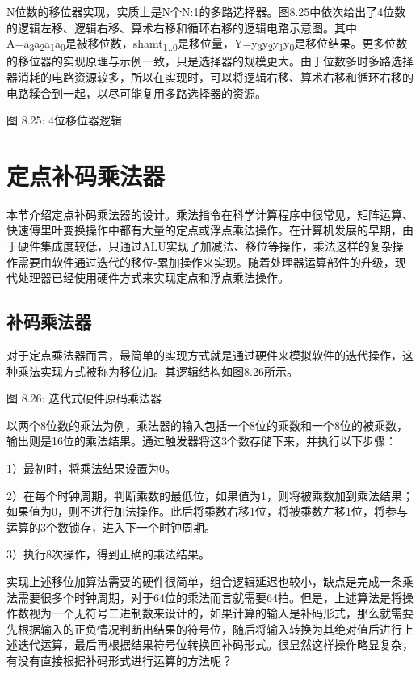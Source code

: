\documentclass[]{ctexbook}
\begin{document}
N位数的移位器实现，实质上是N个N:1的多路选择器。图8.25中依次给出了4位数的逻辑左移、逻辑右移、算术右移和循环右移的逻辑电路示意图。其中A=a\textsubscript{3}a\textsubscript{2}a\textsubscript{1}a\textsubscript{0}是被移位数，shamt\textsubscript{1..0}是移位量，Y=y\textsubscript{3}y\textsubscript{2}y\textsubscript{1}y\textsubscript{0}是移位结果。更多位数的移位器的实现原理与示例一致，只是选择器的规模更大。由于位数多时多路选择器消耗的电路资源较多，所以在实现时，可以将逻辑右移、算术右移和循环右移的电路糅合到一起，以尽可能复用多路选择器的资源。

图 8.25: 4位移位器逻辑

\hypertarget{ux5b9aux70b9ux8865ux7801ux4e58ux6cd5ux5668}{%
\section{定点补码乘法器}\label{ux5b9aux70b9ux8865ux7801ux4e58ux6cd5ux5668}}

本节介绍定点补码乘法器的设计。乘法指令在科学计算程序中很常见，矩阵运算、快速傅里叶变换操作中都有大量的定点或浮点乘法操作。在计算机发展的早期，由于硬件集成度较低，只通过ALU实现了加减法、移位等操作，乘法这样的复杂操作需要由软件通过迭代的移位-累加操作来实现。随着处理器运算部件的升级，现代处理器已经使用硬件方式来实现定点和浮点乘法操作。

\hypertarget{ux8865ux7801ux4e58ux6cd5ux5668}{%
\subsection{补码乘法器}\label{ux8865ux7801ux4e58ux6cd5ux5668}}

对于定点乘法器而言，最简单的实现方式就是通过硬件来模拟软件的迭代操作，这种乘法实现方式被称为移位加。其逻辑结构如图8.26所示。

图 8.26: 迭代式硬件原码乘法器

以两个8位数的乘法为例，乘法器的输入包括一个8位的乘数和一个8位的被乘数，输出则是16位的乘法结果。通过触发器将这3个数存储下来，并执行以下步骤：

1）最初时，将乘法结果设置为0。

2）在每个时钟周期，判断乘数的最低位，如果值为1，则将被乘数加到乘法结果；如果值为0，则不进行加法操作。此后将乘数右移1位，将被乘数左移1位，将参与运算的3个数锁存，进入下一个时钟周期。

3）执行8次操作，得到正确的乘法结果。

实现上述移位加算法需要的硬件很简单，组合逻辑延迟也较小，缺点是完成一条乘法需要很多个时钟周期，对于64位的乘法而言就需要64拍。但是，上述算法是将操作数视为一个无符号二进制数来设计的，如果计算的输入是补码形式，那么就需要先根据输入的正负情况判断出结果的符号位，随后将输入转换为其绝对值后进行上述迭代运算，最后再根据结果符号位转换回补码形式。很显然这样操作略显复杂，有没有直接根据补码形式进行运算的方法呢？
\end{document}
